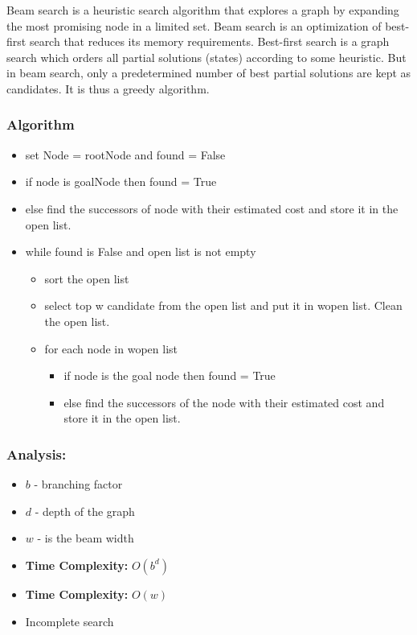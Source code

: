 Beam search is a heuristic search algorithm that explores a graph by expanding
the most promising node in a limited set. Beam search is an optimization of
best-first search that reduces its memory requirements. Best-first search is a
graph search which orders all partial solutions (states) according to some
heuristic. But in beam search, only a predetermined number of best partial
solutions are kept as candidates. It is thus a greedy algorithm.

\subsubsection*{Algorithm}

\begin{itemize}
    \item set Node = rootNode and found = False
    \item if node is goalNode then found = True
    \item else find the successors of node with their estimated
          cost and store it in the open list.
    \item while found is False and open list is not empty
          \begin{itemize}
              \item sort the open list
              \item select top w candidate from the open list and put it in wopen list.
                    Clean the open list.
              \item for each node in wopen list
                    \begin{itemize}
                        \item if node is the goal node then found = True
                        \item else find the successors of the node with their estimated
                              cost and store it in the open list.
                    \end{itemize}
          \end{itemize}
\end{itemize}

\subsubsection*{Analysis:}

\begin{itemize}
      \item $b$ - branching factor
      \item $d$ - depth of the graph
      \item $w$ - is the beam width
      \item \textbf{Time Complexity:} $O(b^d)$
      \item \textbf{Time Complexity:} $O(w)$
      \item Incomplete search
\end{itemize}